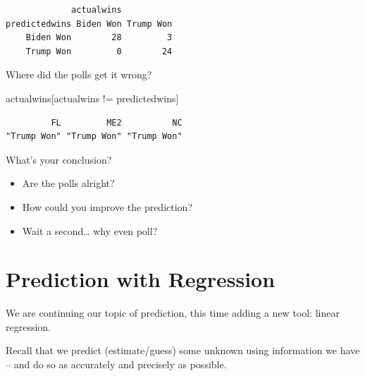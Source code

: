 \documentclass[
  letterpaper,
  DIV=11,
  numbers=noendperiod]{scrreprt}
\newenvironment{Shaded}{\begin{snugshade}}{\end{snugshade}}
\newcommand{\NormalTok}[1]{\textcolor[rgb]{0.00,0.23,0.31}{#1}}
\newcommand{\SpecialCharTok}[1]{\textcolor[rgb]{0.37,0.37,0.37}{#1}}
\providecommand{\tightlist}{%
  \setlength{\itemsep}{0pt}\setlength{\parskip}{0pt}}\usepackage{longtable,booktabs,array}
\begin{document}
\begin{verbatim}
             actualwins
predictedwins Biden Won Trump Won
    Biden Won        28         3
    Trump Won         0        24
\end{verbatim}

Where did the polls get it wrong?

\begin{Shaded}
\begin{Highlighting}[]
\NormalTok{actualwins[actualwins }\SpecialCharTok{!=}\NormalTok{ predictedwins]}
\end{Highlighting}
\end{Shaded}

\begin{verbatim}
         FL         ME2          NC 
"Trump Won" "Trump Won" "Trump Won" 
\end{verbatim}

What's your conclusion?

\begin{itemize}
\tightlist
\item
  Are the polls alright?
\item
  How could you improve the prediction?
\item
  Wait a second\ldots{} why even poll?
\end{itemize}


\hypertarget{regression}{%
\chapter{Prediction with Regression}\label{regression}}

We are continuing our topic of prediction, this time adding a new tool:
linear regression.

Recall that we predict (estimate/guess) some unknown using information
we have -- and do so as accurately and precisely as possible.
\end{document}
